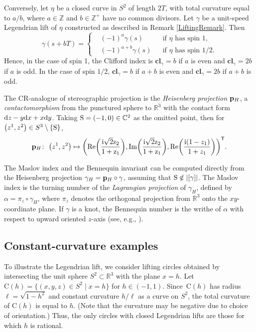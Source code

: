 \documentclass[10pt,a4paper]{amsart}
\def\ri{\mathrm{i}}
\def\gam{\gamma} %
\def\C{\mathbb C}
\def\R{\mathbb R}
\def\Z{\mathbb Z}
\newcommand\cl{\mathbf{cl}}
\newcommand\bp{{\bf p}}
\newcommand\bph{{\bp_H}} %
\newcommand\rC{\mathrm{C}}
\numberwithin{equation}{section}
\begin{document}
\begin{Remark}%
Conversely, let $\eta$ be a closed curve in $S^2$ of length $2T$, with total curvature equal to $a/b$, where $a\in \Z$ and $b\in \Z^+$ have no common divisors. Let $\gam$ be a unit-speed Legendrian lift of $\eta$ constructed as described in Remark \ref{LiftingRemark}. Then
\[\gam(s + b T) = \left\{ \begin{aligned} &(-1)^a \gam(s) & &\text{if $\eta$ has spin $1$,} \\
							&(-1)^{a+b} \gam(s) & &\text{if $\eta$ has spin $1/2$.}
\end{aligned}
\right.
\]
Hence, in the case of spin 1, the Clifford index is $\cl_\gamma = b$ if $a$ is even and $\cl_\gamma=2b$ if $a$ is odd.
In the case of spin $1/2$, $\cl_\gamma=b$ if $a+b$ is even and $\cl_\gamma=2b$ if $a+b$ is odd.
\end{Remark}

\begin{Definition} The CR-analogue of stereographic projection is the {\it Heisenberg projection} $\bp_{H}$, a {\em contactomorphism} from the punctured
sphere to $\R^3$ with the contact form ${\rm d}z-y{\rm d}x+x{\rm d}y$.
Taking ${\rm S}=(-1,0)\in \C^2$ as the omitted point, then for $\bigl(z^1,z^2\bigr)\in S^3\setminus \{{\rm S}\}$,
\begin{equation}\label{heisenbergprojection}
\bph\colon \ \bigl(z^1,z^2\bigr)\mapsto \biggl(\mathrm{Re \biggl(\frac{\ri\sqrt{2}z_2}{1+z_1}\biggr),
\mathrm{Im}\biggl(\frac{\ri\sqrt{2}z_2}{1+z_1}\biggr)},\mathrm{Re}\biggl(\frac{\ri(1-z_1)}{1+z_1}\biggr)\biggr)^{\mathsf{T}}.
\end{equation}
\end{Definition}

\begin{Remark}
The Maslov index and the Bennequin invariant can be computed directly from the Heisenberg projection $\gam_H={\bf p}_H\circ \gam$, assuming that ${\rm S}\notin |[\gam]|$.
The Maslov index is the turning number of the {\it Lagrangian projection} of $\gam_H$, defined by $\alpha = \pi_z\circ \gam_H$, where $\pi_z$ denotes the orthogonal projection from $\R^3$ onto the $xy$-coordinate plane. If $\gam$ is a knot, the Bennequin number is the writhe of $\alpha$ with respect to upward oriented $z$-axis (see, e.g., \cite{ET1}).
\end{Remark}

\subsection{Constant-curvature examples}
To illustrate the Legendrian lift, we consider lifting circles obtained
by intersecting the unit sphere $S^2 \subset \R^3$ with the plane $x=h$.
Let $\rC(h) = \bigl\{ (x,y,z) \in S^2 \mid x=h\bigr\}$ for $h \in (-1,1)$. Since~$\rC(h)$ has
radius $\ell = \sqrt{1-h^2}$ and constant curvature $h/\ell$ as a curve on $S^2$,
the total curvature of $\rC(h)$ is equal to $h$. (Note that the curvature may be negative due to choice of orientation.) Thus, the only circles with closed Legendrian lifts are those for which $h$ is rational.
\end{document}
